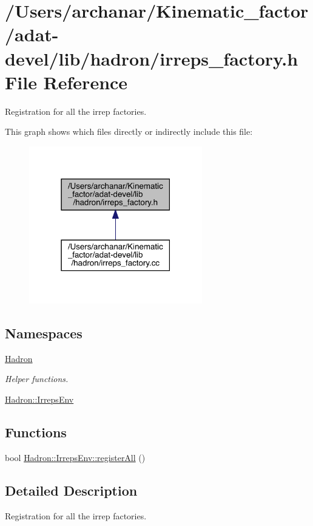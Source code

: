 \hypertarget{adat-devel_2lib_2hadron_2irreps__factory_8h}{}\section{/\+Users/archanar/\+Kinematic\+\_\+factor/adat-\/devel/lib/hadron/irreps\+\_\+factory.h File Reference}
\label{adat-devel_2lib_2hadron_2irreps__factory_8h}


Registration for all the irrep factories.  


This graph shows which files directly or indirectly include this file\+:
\nopagebreak
\begin{figure}[H]
\begin{center}
\leavevmode
\includegraphics[width=214pt]{d7/d5b/adat-devel_2lib_2hadron_2irreps__factory_8h__dep__incl}
\end{center}
\end{figure}
\subsection*{Namespaces}
\begin{DoxyCompactItemize}
\item 
 \mbox{\hyperlink{namespaceHadron}{Hadron}}
\begin{DoxyCompactList}\small\item\em Helper functions. \end{DoxyCompactList}\item 
 \mbox{\hyperlink{namespaceHadron_1_1IrrepsEnv}{Hadron\+::\+Irreps\+Env}}
\end{DoxyCompactItemize}
\subsection*{Functions}
\begin{DoxyCompactItemize}
\item 
bool \mbox{\hyperlink{namespaceHadron_1_1IrrepsEnv_a17654fb199d3c0da80c640ff7e8c6c10}{Hadron\+::\+Irreps\+Env\+::register\+All}} ()
\end{DoxyCompactItemize}


\subsection{Detailed Description}
Registration for all the irrep factories. 

